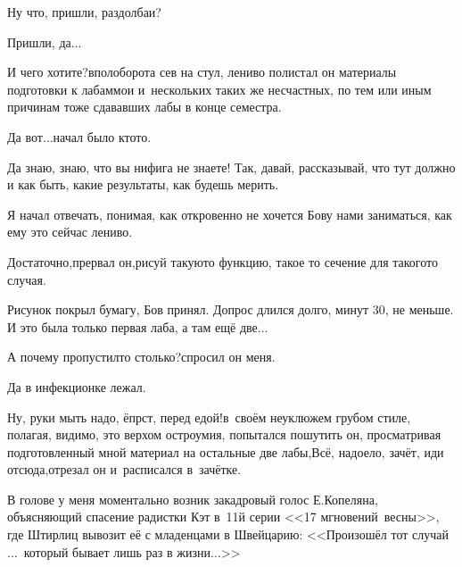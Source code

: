 \diagdash Ну что, пришли, раздолбаи? 

\diagdash Пришли, да$\ldots$

\diagdash И чего хотите?\mdash вполоборота сев на стул, лениво полистал он материалы подготовки к лабам\mdash мои и~нескольких таких же несчастных, по тем или иным причинам тоже сдававших лабы в конце семестра.

\diagdash Да вот$\ldots$\mdash начал было кто\sdash то.

\diagdash Да знаю, знаю, что вы нифига не знаете! Так, давай, рассказывай, что тут должно и как быть, какие результаты, как будешь мерить.

Я начал отвечать, понимая, как откровенно не хочется Б\sdash ову нами заниматься, как ему это сейчас лениво.

\diagdash Достаточно,\mdash прервал он,\mdash рисуй такую\sdash то функцию, такое то сечение для такого\sdash то случая.

Рисунок покрыл бумагу, Б\sdash ов принял. Допрос длился долго, минут 30, не меньше. И это была только первая лаба, а там ещё две$\ldots$

\diagdash А почему пропустил\sdash то столько?\mdash спросил он меня.

\diagdash Да в инфекционке лежал.

\diagdash Ну, руки мыть надо, ёпрст, перед едой!\mdash в~своём неуклюжем грубом стиле, полагая, видимо, это верхом остроумия, попытался пошутить он, просматривая подготовленный мной материал на остальные две лабы,\mdash Всё, надоело, зачёт, иди отсюда,\mdash отрезал он и~расписался в~зачётке.

В голове у меня моментально возник закадровый голос Е.\thinspace Копеляна, объясняющий спасение радистки Кэт в~11\sdash й серии <<17 мгновений~весны>>, где Штирлиц вывозит её с младенцами в Швейцарию: <<Произошёл тот случай~$\ldots$~который бывает лишь раз в жизни$\ldots$>>



\begin{center}
\end{center}